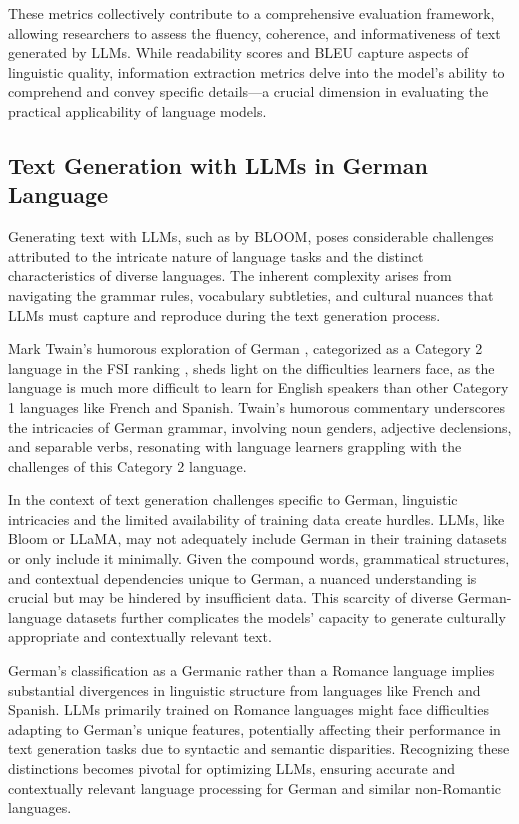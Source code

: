 These metrics collectively contribute to a comprehensive evaluation framework, allowing researchers to assess the fluency, coherence, and informativeness of text generated by LLMs. While readability scores and BLEU capture aspects of linguistic quality, information extraction metrics delve into the model's ability to comprehend and convey specific details—a crucial dimension in evaluating the practical applicability of language models.

\subsection{Text Generation with LLMs in German Language}

Generating text with LLMs, such as by BLOOM, poses considerable challenges attributed to the intricate nature of language tasks and the distinct characteristics of diverse languages. The inherent complexity arises from navigating the grammar rules, vocabulary subtleties, and cultural nuances that LLMs must capture and reproduce during the text generation process.

Mark Twain's humorous exploration of German \cite{twain1880awfulgerman}, categorized as a Category 2 language in the FSI ranking \cite{Kenny}, sheds light on the difficulties learners face, as the language is much more difficult to learn for English speakers than other Category 1 languages like French and Spanish. Twain's humorous commentary underscores the intricacies of German grammar, involving noun genders, adjective declensions, and separable verbs, resonating with language learners grappling with the challenges of this Category 2 language.

In the context of text generation challenges specific to German, linguistic intricacies and the limited availability of training data create hurdles. LLMs, like Bloom or LLaMA, may not adequately include German in their training datasets or only include it minimally. Given the compound words, grammatical structures, and contextual dependencies unique to German, a nuanced understanding is crucial but may be hindered by insufficient data. This scarcity of diverse German-language datasets further complicates the models' capacity to generate culturally appropriate and contextually relevant text.

German's classification as a Germanic rather than a Romance language implies substantial divergences in linguistic structure from languages like French and Spanish. LLMs primarily trained on Romance languages might face difficulties adapting to German's unique features, potentially affecting their performance in text generation tasks due to syntactic and semantic disparities. Recognizing these distinctions becomes pivotal for optimizing LLMs, ensuring accurate and contextually relevant language processing for German and similar non-Romantic languages.






